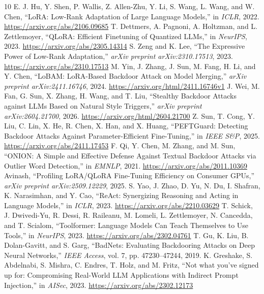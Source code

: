 \documentclass[conference]{IEEEtran}
\begin{document}

\begin{thebibliography}{10}
 E. J. Hu, Y. Shen, P. Wallis, Z. Allen-Zhu, Y. Li, S. Wang, L. Wang, and W. Chen, ``LoRA: Low-Rank Adaptation of Large Language Models,'' in \textit{ICLR}, 2022. \url{https://arxiv.org/abs/2106.09685}
 T. Dettmers, A. Pagnoni, A. Holtzman, and L. Zettlemoyer, ``QLoRA: Efficient Finetuning of Quantized LLMs,'' in \textit{NeurIPS}, 2023. \url{https://arxiv.org/abs/2305.14314}
 S. Zeng and K. Lee, ``The Expressive Power of Low-Rank Adaptation,'' \textit{arXiv preprint arXiv:2310.17513}, 2023. \url{https://arxiv.org/abs/2310.17513}
 M. Yin, J. Zhang, J. Sun, M. Fang, H. Li, and Y. Chen, ``LoBAM: LoRA-Based Backdoor Attack on Model Merging,'' \textit{arXiv preprint arXiv:2411.16746}, 2024. \url{https://arxiv.org/html/2411.16746v1}
 J. Wei, M. Fan, G. Sun, X. Zhang, H. Wang, and T. Liu, ``Stealthy Backdoor Attacks against LLMs Based on Natural Style Triggers,'' \textit{arXiv preprint arXiv:2604.21700}, 2026. \url{https://arxiv.org/html/2604.21700}
 Z. Sun, T. Cong, Y. Liu, C. Lin, X. He, R. Chen, X. Han, and X. Huang, ``PEFTGuard: Detecting Backdoor Attacks Against Parameter-Efficient Fine-Tuning,'' in \textit{IEEE S\&P}, 2025. \url{https://arxiv.org/abs/2411.17453}
 F. Qi, Y. Chen, M. Zhang, and M. Sun, ``ONION: A Simple and Effective Defense Against Textual Backdoor Attacks via Outlier Word Detection,'' in \textit{EMNLP}, 2021. \url{https://arxiv.org/abs/2011.10369}
 Avinash, ``Profiling LoRA/QLoRA Fine-Tuning Efficiency on Consumer GPUs,'' \textit{arXiv preprint arXiv:2509.12229}, 2025.
 S. Yao, J. Zhao, D. Yu, N. Du, I. Shafran, K. Narasimhan, and Y. Cao, ``ReAct: Synergizing Reasoning and Acting in Language Models,'' in \textit{ICLR}, 2023. \url{https://arxiv.org/abs/2210.03629}
 T. Schick, J. Dwivedi-Yu, R. Dessi, R. Raileanu, M. Lomeli, L. Zettlemoyer, N. Cancedda, and T. Scialom, ``Toolformer: Language Models Can Teach Themselves to Use Tools,'' in \textit{NeurIPS}, 2023. \url{https://arxiv.org/abs/2302.04761}
 T. Gu, K. Liu, B. Dolan-Gavitt, and S. Garg, ``BadNets: Evaluating Backdooring Attacks on Deep Neural Networks,'' \textit{IEEE Access}, vol. 7, pp. 47230--47244, 2019.
 K. Greshake, S. Abdelnabi, S. Mishra, C. Endres, T. Holz, and M. Fritz, ``Not what you've signed up for: Compromising Real-World LLM Applications with Indirect Prompt Injection,'' in \textit{AISec}, 2023. \url{https://arxiv.org/abs/2302.12173}
\end{thebibliography}
\end{document}
